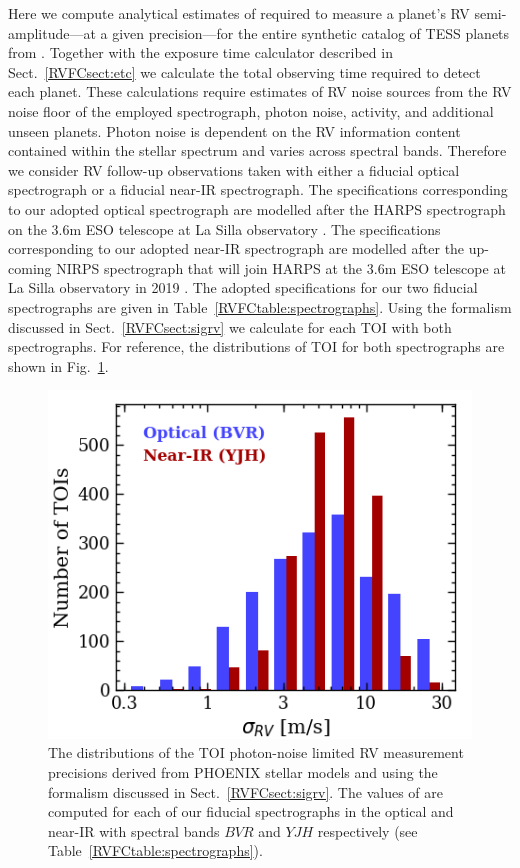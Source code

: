 Here we compute analytical estimates of \nrv{}
required to measure a planet's RV semi-amplitude---at a given precision---for the entire synthetic catalog
of TESS planets from . Together with the exposure time calculator described in
Sect.~\ref{RVFCsect:etc} we calculate the total observing time required to detect each planet. These calculations
require estimates of RV noise sources from the RV noise floor of the employed spectrograph,
photon noise, activity, and additional unseen planets. Photon noise
is dependent on the RV information content contained within the stellar spectrum and varies across spectral
bands. Therefore we consider RV follow-up observations taken with either a fiducial optical spectrograph
or a fiducial near-IR spectrograph. The specifications corresponding to our adopted optical spectrograph are
modelled after the HARPS spectrograph on the 3.6m ESO telescope at La Silla
observatory \citep{mayor03}. The specifications corresponding to our adopted near-IR spectrograph
are modelled after the up-coming NIRPS spectrograph that will join HARPS at the 3.6m ESO
telescope at La Silla observatory in 2019 \citep{bouchy17}. The adopted specifications for our
two fiducial spectrographs are given in Table~\ref{RVFCtable:spectrographs}. Using the formalism discussed in
Sect.~\ref{RVFCsect:sigrv} we calculate \sigRV{} for each TOI with both spectrographs.
For reference, the distributions of TOI \sigRV{} for both spectrographs are shown in Fig.~\ref{RVFCfig:sigRV}. 

\begin{figure}
  \centering
  \includegraphics[width=0.6\hsize]{figures/sigRVhist.png}
  \caption[Histograms of the expected photon-noise limited RV precision for TOIs.]
      {\small The distributions of the TOI photon-noise limited RV measurement precisions derived from
    PHOENIX stellar models and using the formalism discussed in Sect.~\ref{RVFCsect:sigrv}. The values of \sigRV{}
    are computed for each of our fiducial spectrographs in the optical and near-IR with spectral bands $BVR$
    and $YJH$ respectively (see Table~\ref{RVFCtable:spectrographs}).}
  \label{RVFCfig:sigRV}
\end{figure}

